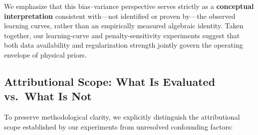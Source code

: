 We emphasize that this bias--variance perspective serves strictly as a \textbf{conceptual interpretation} consistent with---not identified or proven by---the observed learning curves, rather than an empirically measured algebraic identity. Taken together, our learning-curve and penalty-sensitivity experiments suggest that both data availability and regularization strength jointly govern the operating envelope of physical priors.

\subsection{Attributional Scope: What Is Evaluated vs.\ What Is Not}
\label{sec:identification}
To preserve methodological clarity, we explicitly distinguish the attributional scope established by our experiments from unresolved confounding factors:

